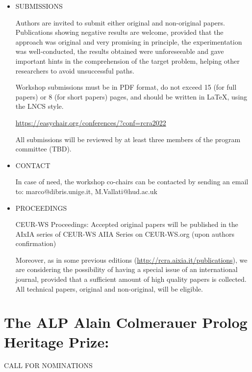 \documentclass[prodmode,acmtecs]{acmsmall} %
\begin{document}
\begin{itemize}
\item  SUBMISSIONS 
 
  Authors are invited to submit either original and non-original papers. Publications showing negative results are welcome, provided that the approach was original and very promising in principle, the experimentation was well-conducted, the results obtained were unforeseeable and gave important hints in the comprehension of the target problem, helping other researchers to avoid unsuccessful paths. 
 
  Workshop submissions must be in PDF format, do not exceed 15 (for full papers) or 8 (for short papers) pages, and should be written in LaTeX, using the LNCS style.  
 
  \href{https://easychair.org/conferences/?conf=rcra2022}{https://easychair.org/conferences/?conf=rcra2022} 
 
  All submissions will be reviewed by at least three members of the program committee (TBD).  
 
\item  CONTACT  
 
  In case of need, the workshop co-chairs can be contacted by sending an email to: marco@dibris.unige.it, M.Vallati@hud.ac.uk  
 
\item  PROCEEDINGS 
 
  CEUR-WS Proceedings: Accepted original papers will be published in the AIxIA series of CEUR-WS AIIA Series on CEUR-WS.org (upon authors confirmation)  
 
  Moreover, as in some previous editions (\href{http://rcra.aixia.it/publications}{http://rcra.aixia.it/publications}), we are considering the possibility of having a special issue of an international journal, provided that a sufficient amount of high quality papers is collected. All technical papers, original and non-original, will be eligible. 
 
\end{itemize}\section{The ALP Alain Colmerauer Prolog Heritage Prize:}\label{TheALPAlainColmerauerPrologHeritagePrize}CALL FOR NOMINATIONS 
\end{document}
